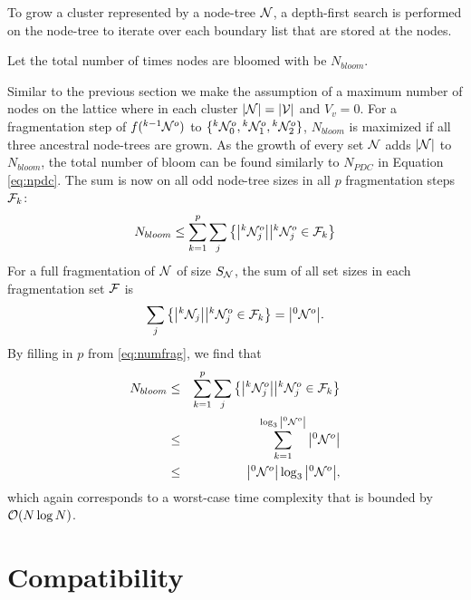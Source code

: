 To grow a cluster represented by a node-tree $\mathcal{N}$, a depth-first search is performed on the node-tree to iterate over each boundary list that are stored at the nodes. 
\begin{definition}\label{def:nbloom}
  Let the total number of times nodes are bloomed with  be $N_{bloom}$.
\end{definition}

Similar to the previous section we make the assumption of a maximum number of nodes on the lattice where in each cluster $|\mathcal{N}| = |\mathcal{V}|$ and $V_v = 0$. For a fragmentation step of $f({}^{k-1}\mathcal{N}^o)$ to $\{{}^{k}\mathcal{N}^o_0, {}^{k}\mathcal{N}^o_1, {}^{k}\mathcal{N}^o_2\}$, $N_{bloom}$ is maximized if all three ancestral node-trees are grown. As the growth of every set $\mathcal{N}$ adds $|\mathcal{N}|$ to $N_{bloom}$, the total number of bloom can be found similarly to $N_{PDC}$ in Equation \eqref{eq:npdc}. The sum is now on all odd node-tree sizes in all $p$ fragmentation steps $\mathcal{F}_k$: 
\begin{equation}\label{eq:nnode}
  N_{bloom} \leq \sum^{p}_{k=1}\sum_j \left\{ \abs{{}^{k}\mathcal{N}^o_j} \big| {}^{k}\mathcal{N}^o_j \in \mathcal{F}_k \right\}
\end{equation}
For a full fragmentation of $\mathcal{N}$ of size $S_{\mathcal{N}}$, the sum of all set sizes in each fragmentation set $\mathcal{F}$ is
\begin{equation}\label{eq:sumsetsfrag}
  \sum_j \left\{ \abs{{}^{k}\mathcal{N}_j} \big| {}^{k}\mathcal{N}^o_j \in \mathcal{F}_k \right\} = \abs{{}^{0}\mathcal{N}^o}.
\end{equation}
By filling in $p$ from \eqref{eq:numfrag}, we find that
\begin{eqnarray}
  \nonumber N_{bloom} &\leq& \sum^{p}_{k=1}\sum_j \left\{ \abs{{}^{k}\mathcal{N}^o_j} \big| {}^{k}\mathcal{N}^o_j \in \mathcal{F}_k \right\} \\
  \nonumber           &\leq& \sum_{k=1}^{\log_3{\abs{{}^{0}\mathcal{N}^o}}} \abs{{}^{0}\mathcal{N}^o} \\
                      &\leq& \abs{{}^{0}\mathcal{N}^o}\log_3{\abs{{}^{0}\mathcal{N}^o}},
\end{eqnarray}
which again corresponds to a worst-case time complexity that is bounded by $\mathcal{O}(N\log{N})$.

\section{Compatibility}\label{sec:ufbbcompatibility}

